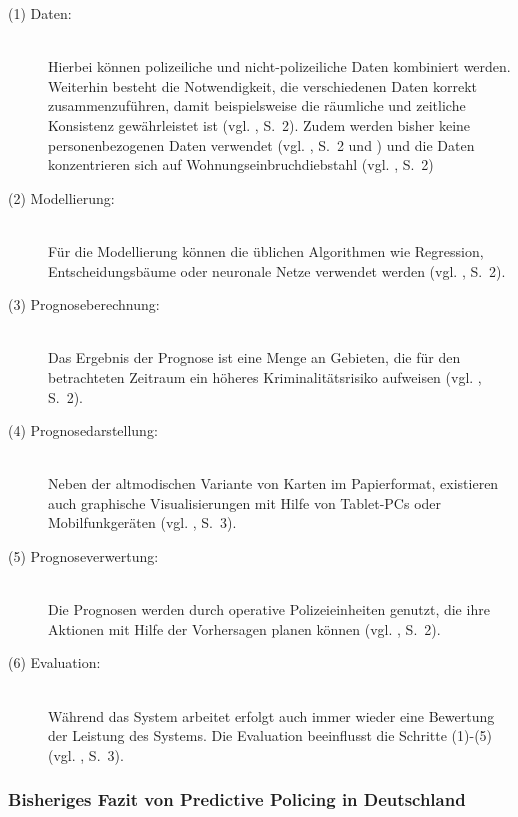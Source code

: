 \begin{description}

\item[(1) Daten:] \hfill \\
Hierbei können polizeiliche und nicht-polizeiliche Daten kombiniert werden. Weiterhin
besteht die Notwendigkeit, die verschiedenen Daten korrekt zusammenzuführen, damit beispielsweise die räumliche
und zeitliche Konsistenz gewährleistet ist (vgl. \cite{Bode}, S.~2). Zudem werden bisher keine
personenbezogenen Daten verwendet (vgl. \cite{Bode}, S.~2 und \cite{Heuberger}) und die Daten konzentrieren
sich auf Wohnungseinbruchdiebstahl (vgl. \cite{Bode}, S.~2)

\item[(2) Modellierung:] \hfill \\
Für die Modellierung können die üblichen Algorithmen wie Regression, Entscheidungsbäume oder
neuronale Netze verwendet werden (vgl. \cite{Bode}, S.~2).

\item[(3) Prognoseberechnung:] \hfill \\
Das Ergebnis der Prognose ist eine Menge an Gebieten, die für den betrachteten Zeitraum
ein höheres Kriminalitätsrisiko aufweisen (vgl. \cite{Bode}, S.~2).

\item[(4) Prognosedarstellung:] \hfill \\
Neben der altmodischen Variante von Karten im Papierformat, existieren auch graphische
Visualisierungen mit Hilfe von Tablet-PCs oder Mobilfunkgeräten (vgl. \cite{Bode}, S.~3).

\item[(5) Prognoseverwertung:] \hfill \\
Die Prognosen werden durch operative Polizeieinheiten genutzt, die ihre Aktionen mit Hilfe
der Vorhersagen planen können (vgl. \cite{Bode}, S.~2).

\item[(6) Evaluation:] \hfill \\
Während das System arbeitet erfolgt auch immer wieder eine Bewertung der Leistung des Systems.
Die Evaluation beeinflusst die Schritte (1)-(5) (vgl. \cite{Bode}, S.~3).

\end{description}

\subsubsection{Bisheriges Fazit von Predictive Policing in Deutschland}

